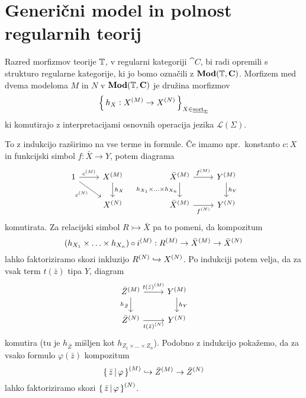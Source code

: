 \documentclass[../kategoricna_logika.tex]{subfiles}
\begin{document}
  \section{Generični model in polnost regularnih teorij}
  \begin{definicija}
    Razred morfizmov teorije $\T$, v regularni kategoriji $\cat{C}$,
    bi radi opremili s strukturo regularne kategorije, ki jo bomo
    označili z $\Mod(\T, \cat{C})$. Morfizem med dvema modeloma $M$ in
    $N$ v $\Mod(\T, \cat{C})$ je družina morfizmov
$$\set{h_X : \interp{X} \to \interp[N]{X}}_{X \in \underline{\mathrm{sort}}_\Sigma}$$
ki komutirajo z interpretacijami osnovnih operacija jezika
$\mathcal{L}(\Sigma)$.
\end{definicija}
To z indukcijo razširimo na vse terme in formule. Če imamo npr.\
konstanto $c:X$ in funkcijski simbol $f:\bar{X} \to Y$, potem diagrama
\begin{equation*}
  \begin{tikzcd}
    1 \ar[dr, "c^{(N)}"'] \ar[r, "\interp{c}"] & \interp{X} \ar[d, "h_X"]  &&  \interp{\bar{X}} \ar[d, "h_{X_1} \times \ldots \times h_{X_n}"'] \ar[r, "\interp{f}"] & \interp{Y} \ar[d, "h_Y"]\\
    & \interp[N]{X} && \interp{\bar{X}} \ar[r, "{\interp[N]{f}}"'] &
    \interp[N]{Y}
  \end{tikzcd}
\end{equation*}
komutirata. Za relacijski simbol $R \rightarrowtail \bar{X}$ pa to
pomeni, da kompozitum
$$(h_{X_1} \times \ldots \times h_{X_n}) \circ \interp{i} : \interp{R} \to \interp{\bar{X}} \to \interp[N]{\bar{X}}$$
lahko faktoriziramo skozi inkluzijo
$\interp[N]{R} \hookrightarrow \interp[N]{X}$.  Po indukciji potem
velja, da za vsak term $t(\bar{z})$ tipa $Y$, diagram
\begin{equation*}
  \begin{tikzcd}
    \interp{\bar{Z}} \ar[d, "h_{\bar{Z}}"'] \ar[r, "{t(\bar{z})^{(M)}}"] & \interp{Y} \ar[d, "h_Y"] \\
    \interp[N]{\bar{Z}} \ar[r, "{\interp[N]{t(\bar{z})}}"'] &
    \interp[N]{Y}
  \end{tikzcd}
\end{equation*}
komutira (tu je $h_{\bar{Z}}$ mišljen kot
$h_{Z_1 \times \ldots \times Z_n}$).  Podobno z indukcijo pokažemo, da
za vsako formulo $\varphi(\bar{z})$ kompozitum
$$\interp{\set{\bar{z} \,\middle|\, \varphi}} \hookrightarrow \interp{\bar{Z}} \to \interp[N]{\bar{Z}}$$
lahko faktoriziramo skozi
$\interp[N]{\set{\bar{z} \,\middle|\, \varphi}}$.
\end{document}
